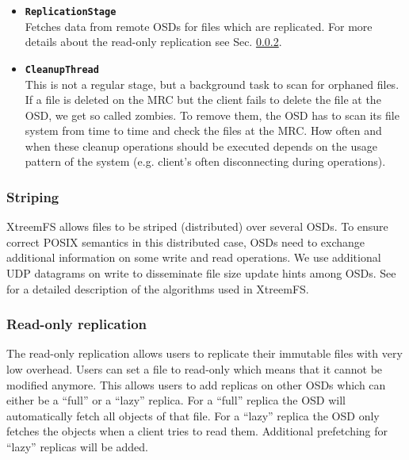\begin{itemize}
 \item \textbf{\texttt{ReplicationStage}}\\
Fetches data from remote OSDs for files which are replicated. For more details about the read-only replication see Sec. \ref{sec:xtreemfs_ronly_replication}.

 \item \textbf{\texttt{CleanupThread}}\\
This is not a regular stage, but a background task to scan for orphaned files. If a file is deleted on the MRC but the client fails to delete the file at the OSD, we get so called zombies. To remove them, the OSD has to scan its file system from time to time and check the files at the MRC. How often and when these cleanup operations should be executed depends on the usage pattern of the system (e.g. client's often disconnecting during operations).
\end{itemize}

\subsubsection{Striping}
XtreemFS allows files to be striped (distributed) over several OSDs. To ensure correct POSIX semantics in this distributed case, OSDs need to exchange additional information on some write and read operations. We use additional UDP datagrams on write to disseminate file size update hints among OSDs. See \cite{StripingLasco} for a detailed description of the algorithms used in XtreemFS.

\subsubsection{Read-only replication}
\label{sec:xtreemfs_ronly_replication}
The read-only replication allows users to replicate their immutable files with very low overhead. Users can set a file to read-only which means that it cannot be modified anymore. This allows users to add replicas on other OSDs which can either be a ``full'' or a ``lazy'' replica. For a ``full'' replica the OSD will automatically fetch all objects of that file. For a ``lazy'' replica the OSD only fetches the objects when a client tries to read them. Additional prefetching for ``lazy'' replicas will be added.
